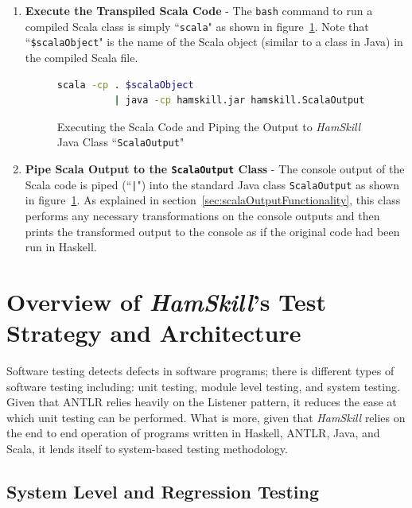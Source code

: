 \documentclass{report}
\begin{document}
\begin{enumerate}
\item \textbf{Execute the Transpiled Scala Code} - The \texttt{bash} command to run a compiled Scala class is simply ``\texttt{scala}" as shown in figure~\ref{fig:runScalaAndConvertOutput}.  Note that ``\texttt{\$scalaObject}" is the name of the Scala object (similar to a class in Java) in the compiled Scala file.

\begin{figure}[H]
\begin{mdframed}
\begin{lstlisting}[language=bash]
scala -cp . $scalaObject 
          | java -cp hamskill.jar hamskill.ScalaOutput
\end{lstlisting}
\end{mdframed}
\caption{Executing the Scala Code and Piping the Output to \textit{HamSkill} Java Class ``\texttt{ScalaOutput}"}\label{fig:runScalaAndConvertOutput}
\end{figure}

\item \textbf{Pipe Scala Output to the \texttt{ScalaOutput} Class} - The console output of the Scala code is piped (``\texttt{|}") into the standard Java class \texttt{ScalaOutput} as shown in figure~\ref{fig:runScalaAndConvertOutput}.  As explained in section~\ref{sec:scalaOutputFunctionality}, this class performs any necessary transformations on the console outputs and then prints the transformed output to the console as if the original code had been run in Haskell.

\end{enumerate} 


\section{Overview of \textit{HamSkill}'s Test Strategy and Architecture}

Software testing detects defects in software programs; there is different types of software testing including: unit testing, module level testing, and system testing.  Given that ANTLR relies heavily on the Listener pattern, it reduces the ease at which unit testing can be performed.  What is more, given that \textit{HamSkill} relies on the end to end operation of programs written in Haskell, ANTLR, Java, and Scala, it lends itself to system-based testing methodology.

\subsection{System Level and Regression Testing}
\end{document}
